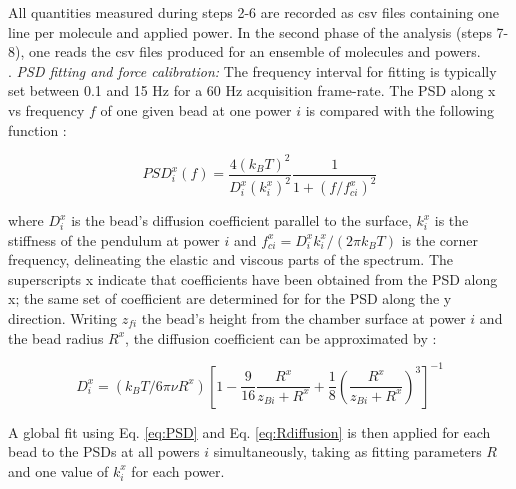 \documentclass{biophys-new}
\begin{document}
All quantities measured during steps 2-6 are recorded as csv files containing one line per molecule and applied power. In the second phase of the analysis (steps 7-8), one reads the csv files produced for an ensemble of molecules and powers.\\

. \textit{ PSD fitting and force calibration:}
The frequency interval for fitting is typically set between 0.1 and 15 Hz for a 60 Hz acquisition frame-rate. The PSD along x vs frequency $f$ of one given bead at one power $i$ is compared with the following function \cite{daldrop2015}:

\begin{equation}
\label{eq:PSD}
PSD^x_i(f) = \dfrac{4 (k_B T)^2}{D^x_i (k^x_i)^2} \frac{1}{ 1+ (f / f^x_{ci})^2}
\end{equation}

\noindent where $D^x_i$ is the bead's diffusion coefficient parallel to the surface, $k^x_i$ is the stiffness of the pendulum at power $i$ and $f^x_{ci} = D^x_i k^x_i/( 2\pi k_B T )$ is the corner frequency, delineating the elastic and viscous parts of the spectrum. The superscripts x indicate that coefficients have been obtained from the PSD along x; the same set of coefficient are determined for for the PSD along the y direction.
Writing $z_{fi}$  the bead's height from the chamber surface at power $i$ and the bead radius $R^x$, the diffusion coefficient can be approximated by \cite{schaffer2007}:

\begin{equation}
\label{eq:Rdiffusion}
D^x_i = ( k_B T / 6\pi \nu R^x ) \left[  1 - \frac{9}{16}\frac{R^x}{z_{Bi}+R^x} + \frac{1}{8} \left( \frac{R^x}{z_{Bi}+R^x} \right)^3 \right]^{-1}
\end{equation}

A global fit using Eq. \ref{eq:PSD} and Eq. \ref{eq:Rdiffusion} is then applied for each bead to the PSDs at all powers $i$ simultaneously, taking as fitting parameters $R$ and one value of $k^x_i$ for each power.
\end{document}

